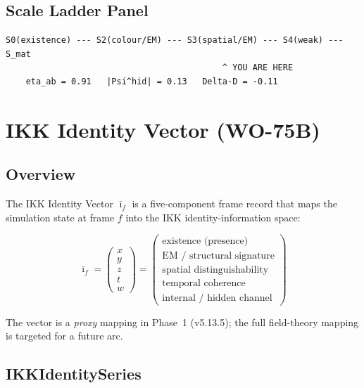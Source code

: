 \documentclass[11pt,a4paper]{article}
\theoremstyle{definition}
\newcommand{\ivec}{\bar{\imath}_f}
\begin{document}
\subsection{Scale Ladder Panel}

\begin{lstlisting}[style=eventprint,
  caption={Scale ladder bottom bar concept.}]
S0(existence) --- S2(colour/EM) --- S3(spatial/EM) --- S4(weak) --- S_mat
										   ^ YOU ARE HERE
	eta_ab = 0.91   |Psi^hid| = 0.13   Delta-D = -0.11
\end{lstlisting}

\section{IKK Identity Vector (WO-75B)}

\subsection{Overview}

The IKK Identity Vector $\ivec$ is a five-component frame record that maps
the simulation state at frame $f$ into the IKK identity-information space:

\[
\ivec
=
\begin{pmatrix}
  x \\ y \\ z \\ t \\ w
\end{pmatrix}
=
\begin{pmatrix}
  \text{existence (presence)} \\
  \text{EM / structural signature} \\
  \text{spatial distinguishability} \\
  \text{temporal coherence} \\
  \text{internal / hidden channel}
\end{pmatrix}
\]

The vector is a \emph{proxy} mapping in Phase~1 (v5.13.5); the full
field-theory mapping is targeted for a future arc.

\subsection{IKKIdentitySeries}
\end{document}
